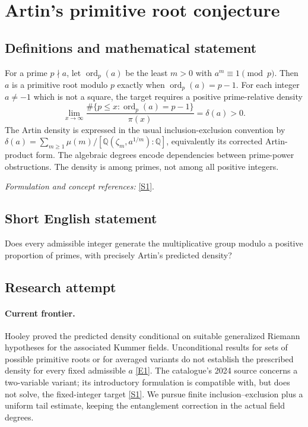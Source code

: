 \documentclass[11pt,a4paper]{article}
\newcommand{\Q}{\mathbb{Q}}
\newcommand{\sref}[2]{\hyperlink{source:#1:#2}{[S#2]}}
\newcommand{\eref}[2]{\hyperlink{extra:#1:#2}{[E#2]}}
\newif\ifshowcatalogue
\newcommand{\cataloguescope}[1]{\ifshowcatalogue
 \paragraph{Exact scope in the supplied catalogue.}
 \begin{quote}\small #1\end{quote}\fi}
\numberwithin{equation}{section}
\begin{document}
\setcounter{section}{196}
\clearpage
\section{\texorpdfstring{Artin's primitive root conjecture}{Artin's primitive root conjecture}}\label{197}
\subsection{Definitions and mathematical statement}
For a prime $p\nmid a$, let $\operatorname{ord}_p(a)$ be the least $m>0$ with $a^m\equiv1\pmod p$. Then $a$ is a primitive root modulo $p$ exactly when $\operatorname{ord}_p(a)=p-1$. For each integer $a\ne-1$ which is not a square, the target requires a positive prime-relative density
\[
 \lim_{x\to\infty}\frac{\#\{p\le x:\operatorname{ord}_p(a)=p-1\}}{\pi(x)}=\delta(a)>0.
\]
The Artin density is expressed in the usual inclusion-exclusion convention by
$\delta(a)=\sum_{m\ge1}\mu(m)/[\Q(\zeta_m,a^{1/m}):\Q]$, equivalently its corrected Artin-product form. The algebraic degrees encode dependencies between prime-power obstructions. The density is among primes, not among all positive integers.
\par\smallskip\textit{Formulation and concept references:} \sref{197}{1}.
\cataloguescope{Prove or disprove that every integer a other than -1 that is not a perfect square is a primitive root modulo p for a positive natural density of primes p, with the density given by Artin's predicted correction factor.}
\subsection{Short English statement}
Does every admissible integer generate the multiplicative group modulo a positive proportion of primes, with precisely Artin's predicted density?
\subsection{Research attempt}

\paragraph{Current frontier.}
Hooley proved the predicted density conditional on suitable generalized Riemann hypotheses for the associated Kummer fields. Unconditional results for sets of possible primitive roots or for averaged variants do not establish the prescribed density for every fixed admissible $a$ \eref{197}{1}. The catalogue's 2024 source concerns a two-variable variant; its introductory formulation is compatible with, but does not solve, the fixed-integer target \sref{197}{1}. We pursue finite inclusion--exclusion plus a uniform tail estimate, keeping the entanglement correction in the actual field degrees.
\end{document}
